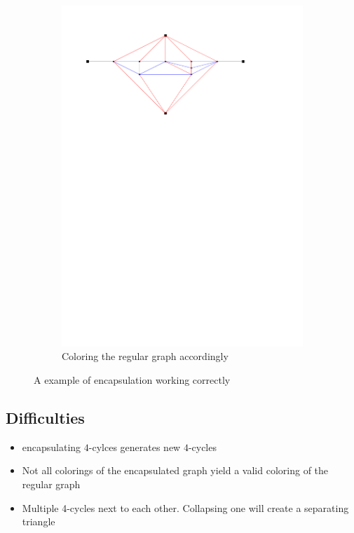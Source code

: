 \documentclass[a4paper]{article}
\theoremstyle{definition}
\begin{document}
\begin{figure}[h]
        \begin{subfigure}[b]{\textwidth}
        \includegraphics[width=\textwidth]{img/problemGraph3}
        \caption{Coloring the regular graph accordingly}
    \end{subfigure}

    	\caption{A example of encapsulation working correctly}
	\label{fig:prGr}
\end{figure}



\subsection{Difficulties}
\begin{itemize}
\item encapsulating $4$-cylces generates new $4$-cycles
\item Not all colorings of the encapsulated graph yield a valid coloring of the regular graph
\item Multiple 4-cycles next to each other. Collapsing one will create a separating triangle
\end{itemize}
\end{document}
